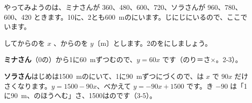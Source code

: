 \noindent やってみようのは、ミナさんが 360、480、600、720、ソラさんが 960、780、600、420 ときます。10に、2とも\qty{600}{m}のにいます。じにじにいるので、ここでいます。




\leavevmode\label{bk:3-6:kouten}してからのを $x$ 、からのを $y$〔m〕とします。2のをにしましょう。

\textbf{ミナさん}\quad {}（0の）から1に\qty{60}{m}ずつむので、$y=60x$ です（のり＝さ×。2-3）。

\textbf{ソラさん}\quad はじめは\qty{1500}{m}のにいて、1に\qty{90}{m}ずつにづくので、は $x$ で $90x$ だけさくなります。$y=1500-90x$、べかえて $y=-90x+1500$ です。き $-90$ は「1に\qty{90}{m}、のほうへむ」さ、1500はのです（3-5）。


